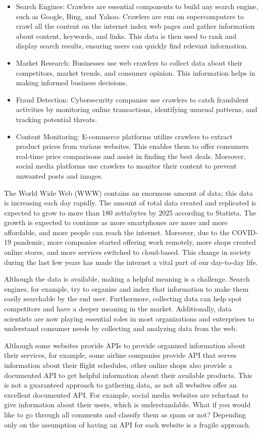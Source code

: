 \begin{itemize}
  \item Search Engines: Crawlers are essential components to build any search engine, such as Google, Bing, and Yahoo. Crawlers are run on supercomputers to crawl all the content on the internet index web pages and gather information about content, keywords, and links. This data is then used to rank and display search results, ensuring users can quickly find relevant information.
  \item Market Research: Businesses use web crawlers to collect data about their competitors, market trends, and consumer opinion. This information helps in making informed business decisions.
  \item Fraud Detection: Cybersecurity companies use crawlers to catch fraudulent activities by monitoring online transactions, identifying unusual patterns, and tracking potential threats.
  \item Content Monitoring: E-commerce platforms utilize crawlers to extract product prices from various websites. This enables them to offer consumers real-time price comparisons and assist in finding the best deals. Moreover, social media platforms use crawlers to monitor their content to prevent unwanted posts and images.
\end{itemize}

The World Wide Web (WWW) contains an enormous amount of data; this data is increasing each day rapidly. The amount of total data created and replicated is expected to grow to more than 180 zettabytes by 2025 according to Statista. The growth is expected to continue as more smartphones are more and more affordable, and more people can reach the internet. Moreover, due to the COVID-19 pandemic, more companies started offering work remotely, more shops created online stores, and more services switched to cloud-based. This change in society during the last few years has made the internet a vital part of our day-to-day life.   

Although the data is available, making a helpful meaning is a challenge. Search engines, for example, try to organize and index that information to make them easily searchable by the end user. Furthermore, collecting data can help spot competitors and have a deeper meaning in the market. Additionally, data scientists are now playing essential roles in most organizations and enterprises to understand consumer needs by collecting and analyzing data from the web.  


Although some websites provide APIs to provide organized information about their services, for example, some airline companies provide API that serves information about their flight schedules, other online shops also provide a documented API to get helpful information about their available products. This is not a guaranteed approach to gathering data, as not all websites offer an excellent documented API. For example, social media websites are reluctant to give information about their users, which is understandable. What if you would like to go through all comments and classify them as spam or not? Depending only on the assumption of having an API for each website is a fragile approach. 

